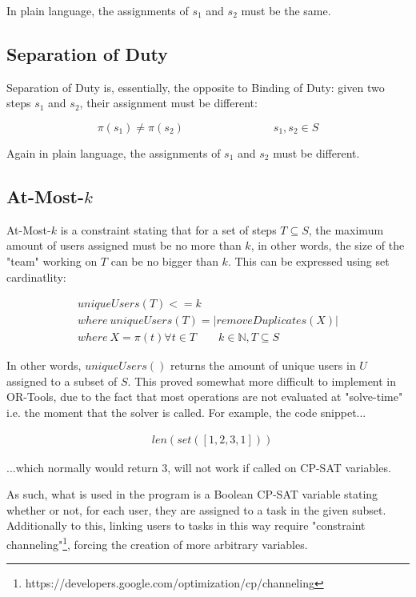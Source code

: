 \documentclass[11pt]{article}
\begin{document}
			In plain language, the assignments of \(s_1\) and \(s_2\) must be the same.

		\subsection{Separation of Duty}

			Separation of Duty is, essentially, the opposite to Binding of Duty:
			given two steps \(s_1\) and \(s_2\),
			their assignment must be different:

			\begin{equation}
				\pi(s_1) \neq \pi(s_2) \qquad \qquad \qquad \qquad s_1, s_2 \in S
			\end{equation}

			Again in plain language, the assignments of \(s_1\) and \(s_2\) must be different.

		\subsection{At-Most-\(k\)}

			At-Most-\(k\) is a constraint stating that for a set of steps \(T \subseteq S\),
			the maximum amount of users assigned must be no more than \(k\),
			in other words, the size of the "team" working on \(T\) can be no bigger than \(k\).
			This can be expressed using set cardinatlity:

			\begin{multline}
				uniqueUsers(T) <= k\\
				where \ uniqueUsers(T) = |removeDuplicates(X)|\\
				where \ X = \pi(t)\forall t \in T \qquad k \in \mathbb{N}, T \subseteq S
			\end{multline}
			
			In other words, \(uniqueUsers()\) returns the amount of unique users in \(U\) assigned to a subset of \(S\).
			This proved somewhat more difficult to implement in OR-Tools,
			due to the fact that most operations are not evaluated at "solve-time"
			i.e. the moment that the solver is called. For example, the code snippet...

			\begin{align*}
				&len(set([1,2,3,1]))
			\end{align*}

			...which normally would return \(3\), will not work if called on CP-SAT variables.

			As such, what is used in the program is a Boolean CP-SAT variable stating whether or not,
			for each user, they are assigned to a task in the given subset.
			Additionally to this, linking users to tasks in this way require "constraint channeling"\footnote{https://developers.google.com/optimization/cp/channeling},
			forcing the creation of more arbitrary variables.
			
\end{document}
